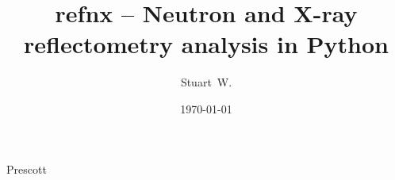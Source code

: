 \documentclass[pdf,preprint]{iucr}
\begin{document}
\title{refnx -- Neutron and X-ray reflectometry analysis in Python}
\author[b]{Stuart~W.}{Prescott}


\date{\today}

\newcommand{\refnx}{\emph{refnx}}
\newcommand{\Objective}{\textbf{Objective}}
\newcommand{\GlobalObjective}{\textbf{GlobalObjective}}
\newcommand{\Parameter}{\textbf{Parameter}}
\newcommand{\Structure}{\textbf{Structure}}
\newcommand{\Slab}{\textbf{Slab}}
\newcommand{\Component}{\textbf{Component}}
\newcommand{\LipidLeaflet}{\textbf{LipidLeaflet}}
\newcommand{\Transform}{\textbf{Transform}}
\newcommand{\DataD}{\textbf{Data1D}}
\newcommand{\ReflectModel}{\textbf{ReflectModel}}
\newcommand{\CurveFitter}{\textbf{CurveFitter}}
\newcommand{\Spline}{\textbf{Spline}}
\newcommand{\conda}{\emph{conda}}
\newcommand{\corner}{\emph{corner}}
\newcommand{\MixedReflectModel}{\textbf{MixedReflectModel}}
\newcommand{\pip}{\emph{pip}}
\newcommand{\emcee}{\emph{emcee}}
\newcommand{\ptemcee}{\emph{ptemcee}}
\newcommand{\NumPy}{\emph{NumPy}}
\newcommand{\SciPy}{\emph{SciPy}}
\newcommand{\Cython}{\emph{Cython}}
\newcommand{\Jupyter}{\emph{Jupyter}}
\newcommand{\ipywidgets}{\emph{ipywidgets}}

\maketitle

\begin{synopsis}
\end{synopsis}

\end{document}
